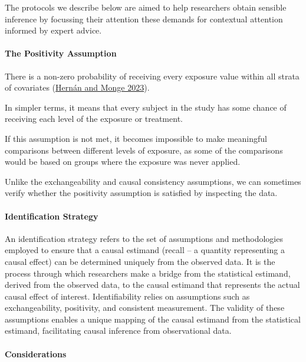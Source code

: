 \documentclass[
  singlecolumn]{article}
\let\oldparagraph\paragraph
\renewcommand{\paragraph}[1]{\oldparagraph{#1}\mbox{}}
\begin{document}
The protocols we describe below are aimed to help researchers obtain
sensible inference by focussing their attention these demands for
contextual attention informed by expert advice.

\paragraph{\texorpdfstring{\textbf{The Positivity
Assumption}}{The Positivity Assumption}}\label{the-positivity-assumption}

There is a non-zero probability of receiving every exposure value within
all strata of covariates (\hyperref[ref-hernuxe1n2023]{Hernán and Monge
2023}).

In simpler terms, it means that every subject in the study has some
chance of receiving each level of the exposure or treatment.

If this assumption is not met, it becomes impossible to make meaningful
comparisons between different levels of exposure, as some of the
comparisons would be based on groups where the exposure was never
applied.

Unlike the exchangeability and causal consistency assumptions, we can
sometimes verify whether the positivity assumption is satisfied by
inspecting the data.

\paragraph{\texorpdfstring{\textbf{Identification
Strategy}}{Identification Strategy}}\label{identification-strategy}

An identification strategy refers to the set of assumptions and
methodologies employed to ensure that a causal estimand (recall -- a
quantity representing a causal effect) can be determined uniquely from
the observed data. It is the process through which researchers make a
bridge from the statistical estimand, derived from the observed data, to
the causal estimand that represents the actual causal effect of
interest. Identifiability relies on assumptions such as exchangeability,
positivity, and consistent measurement. The validity of these
assumptions enables a unique mapping of the causal estimand from the
statistical estimand, facilitating causal inference from observational
data.

\paragraph{Considerations}\label{considerations}
\end{document}
